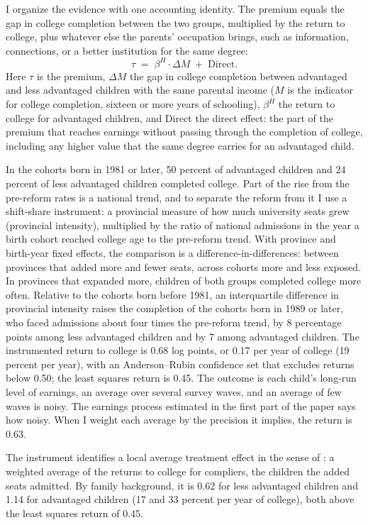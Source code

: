 \documentclass[11pt]{article}
\begin{document}
I organize the evidence with one
accounting identity. The premium equals the gap in college completion
between the two groups, multiplied by the return to college, plus
whatever else the parents' occupation brings, such as information,
connections, or a better institution for the same degree:
\begin{equation}
\tau \;=\; \beta^{H} \cdot \Delta M \;+\; \mathrm{Direct}.
\label{eq:hp-intro}
\end{equation}
Here $\tau$ is the premium, $\Delta M$ the gap in college
completion between advantaged and less advantaged children with the same parental income ($M$ is the
indicator for college completion, sixteen or more years of schooling), $\beta^{H}$ the return to college
for advantaged children, and Direct the direct effect: the part of the premium that reaches earnings without passing through the completion of college, including any higher value that the same degree carries for an advantaged child.

In the cohorts born in 1981 or later, 50 percent of advantaged children and 24 percent of less advantaged children completed college. Part of the rise from the pre-reform rates is a national trend, and to separate the
reform from it I use a shift-share instrument: a
provincial measure of how much university seats grew (provincial intensity), multiplied by
the
ratio of national admissions in the year a birth cohort reached college age
to the pre-reform trend. With province and birth-year fixed effects,
the comparison is a difference-in-differences: between provinces that added more and fewer seats, across cohorts more and less exposed. In provinces that expanded more, children of both groups completed college more often. Relative to the cohorts born before 1981, an interquartile difference in provincial intensity raises the completion of the cohorts born in 1989 or later, who faced admissions about four times the pre-reform trend, by 8 percentage points among less advantaged children and by 7 among advantaged children. The instrumented return to college is 0.68 log points, or 0.17 per year of college (19 percent per year), with an Anderson--Rubin confidence set that excludes returns below 0.50; the least squares
return is 0.45. The outcome is each child's long-run level of earnings, an average over several survey waves, and an average of few waves is noisy. The earnings process estimated in the first part of the paper says how noisy. When I weight each average by the precision it implies, the return is 0.63.

The instrument identifies a local average treatment effect in the sense of \citet{ImbensAngrist1994}: a weighted average of the returns to college for compliers, the children the added seats admitted. By family background, it is 0.62 for less advantaged children and 1.14 for advantaged children (17 and 33 percent per year of college), both above the least squares return of 0.45.
\end{document}

